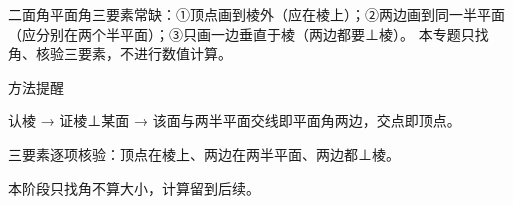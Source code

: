 \documentclass{exam-zh}
\begin{document}
\begin{eduMistakeBox}
二面角平面角三要素常缺：①顶点画到棱外（应在棱上）；②两边画到同一半平面（应分别在两个半平面）；③只画一边垂直于棱（两边都要⊥棱）。
本专题只找角、核验三要素，不进行数值计算。
\end{eduMistakeBox}




\begin{eduSummaryBlock}{\eduIconPin}{方法提醒}
\begin{eduBulletList}
  \item 认棱 → 证棱⊥某面 → 该面与两半平面交线即平面角两边，交点即顶点。  \item 三要素逐项核验：顶点在棱上、两边在两半平面、两边都⊥棱。  \item 本阶段只找角不算大小，计算留到后续。\end{eduBulletList}
\end{eduSummaryBlock}
\end{document}
